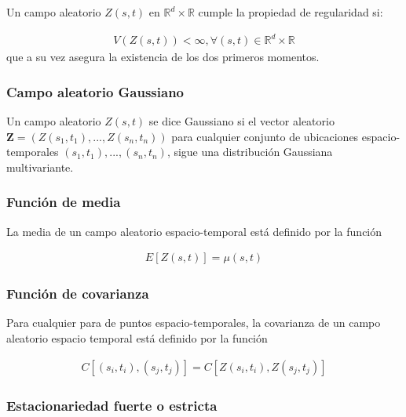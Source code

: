 \documentclass[
]{book}
\begin{document}
Un campo aleatorio \(Z(s,t)\) en \(\mathbb{R}^d\times \mathbb{R}\) cumple la propiedad de regularidad si:

\[
\begin{align*}
V(Z(s,t))<\infty, \forall (s,t) \in \mathbb{R}^d\times \mathbb{R}
\end{align*}
\] que a su vez asegura la existencia de los dos primeros momentos.

\hypertarget{campo-aleatorio-gaussiano}{%
\subsubsection*{Campo aleatorio Gaussiano}\label{campo-aleatorio-gaussiano}}

Un campo aleatorio \(Z(s,t)\) se dice Gaussiano si el vector aleatorio \(\textbf{Z}=(Z(s_1,t_1),...,Z(s_n,t_n))\) para cualquier conjunto de ubicaciones espacio-temporales \({(s_1,t_1),...,(s_n,t_n)}\), sigue una distribución Gaussiana multivariante.

\hypertarget{funciuxf3n-de-media-1}{%
\subsubsection*{Función de media}\label{funciuxf3n-de-media-1}}

La media de un campo aleatorio espacio-temporal está definido por la función

\[
  \begin{align*}
  E[Z(s,t)]=\mu(s,t)
  \end{align*}
\]

\hypertarget{funciuxf3n-de-covarianza-1}{%
\subsubsection*{Función de covarianza}\label{funciuxf3n-de-covarianza-1}}

Para cualquier para de puntos espacio-temporales, la covarianza de un campo aleatorio espacio temporal está definido por la función

\[
\begin{align*}
C[(s_i,t_i),(s_j,t_j)]=C[Z(s_i,t_i),Z(s_j,t_j)]
\end{align*}
\]

\hypertarget{estacionariedad-fuerte-o-estricta}{%
\subsubsection*{Estacionariedad fuerte o estricta}\label{estacionariedad-fuerte-o-estricta}}
\end{document}
